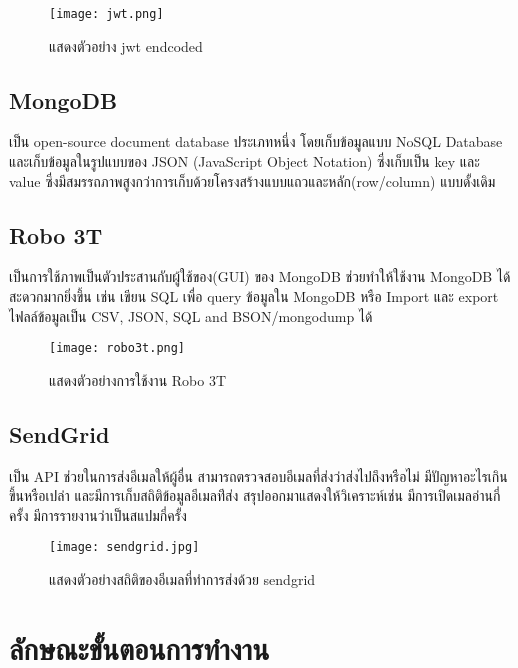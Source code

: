 \begin{figure}[H]
  \centering
  \texttt{[image: jwt.png]}
  \caption{แสดงตัวอย่าง jwt endcoded}
  \label{Fig:jwt}
\end{figure}

\subsection{MongoDB}

เป็น open-source document database ประเภทหนึ่ง โดยเก็บข้อมูลแบบ NoSQL Database และเก็บข้อมูลในรูปแบบของ JSON (JavaScript Object Notation) ซึ่งเก็บเป็น key และ value ซึ่งมีสมรรถภาพสูงกว่าการเก็บด้วยโครงสร้างแบบแถวและหลัก(row/column) แบบดั้งเดิม~\cite{mongodb}

\subsection{Robo 3T}

เป็นการใช้ภาพเป็นตัวประสานกับผู้ใช้ของ(GUI) ของ MongoDB ช่วยทำให้ใช้งาน MongoDB ได้สะดวกมากยิ่งขึ้น เช่น เขียน SQL เพื่อ query ข้อมูลใน MongoDB หรือ Import และ export ไฟลล์ข้อมูลเป็น CSV, JSON, SQL and BSON/mongodump ได้~\cite{robo3t}

\begin{figure}[H]
  \centering
  \texttt{[image: robo3t.png]}
  \caption{แสดงตัวอย่างการใช้งาน Robo 3T}
  \label{Fig:robo3t}
\end{figure}

\subsection{SendGrid}

เป็น API ช่วยในการส่งอีเมลให้ผู้อื่น สามารถตรวจสอบอีเมลที่ส่งว่าส่งไปถึงหรือไม่ มีปัญหาอะไรเกินขึ้นหรือเปล่า และมีการเก็บสถิติข้อมูลอีเมลท่ีส่ง สรุปออกมาแสดงให้วิเคราะห์เช่น มีการเปิดเมลอ่านกี่ครั้ง มีการรายงานว่าเป็นสแปมกี่ครั้ง

\begin{figure}[H]
  \centering
  \texttt{[image: sendgrid.jpg]}
  \caption{แสดงตัวอย่างสถิติของอีเมลที่ทำการส่งด้วย sendgrid}
  \label{Fig:robo3t}
\end{figure}

\section{ลักษณะขั้นตอนการทํางาน}

